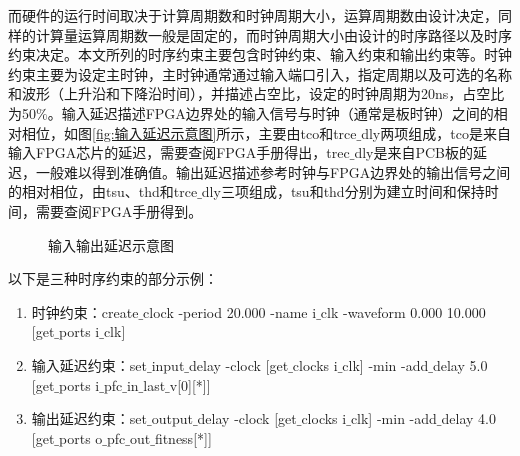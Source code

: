 而硬件的运行时间取决于计算周期数和时钟周期大小，运算周期数由设计决定，同样的计算量运算周期数一般是固定的，而时钟周期大小由设计的时序路径以及时序约束决定。本文所列的时序约束主要包含时钟约束、输入约束和输出约束等。时钟约束主要为设定主时钟，主时钟通常通过输入端口引入，指定周期以及可选的名称和波形（上升沿和下降沿时间），并描述占空比，设定的时钟周期为20ns，占空比为50$\%$。输入延迟描述FPGA边界处的输入信号与时钟（通常是板时钟）之间的相对相位，如图\ref{fig:输入延迟示意图}所示，主要由tco和trce$\_$dly两项组成，tco是来自输入FPGA芯片的延迟，需要查阅FPGA手册得出，trec$\_$dly是来自PCB板的延迟，一般难以得到准确值。输出延迟描述参考时钟与FPGA边界处的输出信号之间的相对相位，由tsu、thd和trce$\_$dly三项组成，tsu和thd分别为建立时间和保持时间，需要查阅FPGA手册得到。
\begin{figure}[htb]
  \centering
  \caption{输入输出延迟示意图}
  \label{fig:输入输出延迟示意图}
\end{figure}

以下是三种时序约束的部分示例：
\begin{enumerate}
  \item 时钟约束：create$\_$clock -period 20.000 -name i$\_$clk -waveform {0.000 10.000} [get$\_$ports i$\_$clk]
  \item 输入延迟约束：set$\_$input$\_$delay -clock [get$\_$clocks i$\_$clk] -min -add$\_$delay 5.0 [get$\_$ports {i$\_$pfc$\_$in$\_$last$\_$v[0][*]}]
  \item 输出延迟约束：set$\_$output$\_$delay -clock [get$\_$clocks i$\_$clk] -min -add$\_$delay 4.0 [get$\_$ports {o$\_$pfc$\_$out$\_$fitness[*]}]
\end{enumerate}


